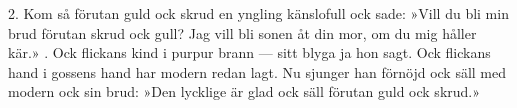 \setlength{\columnsep}{0.5cm}
\begin{multicols*}{2}
2.  Kom så förutan guld ock skrud
    en yngling känslofull
    ock sade: »Vill du bli min brud
    förutan skrud ock gull?
    Jag vill bli sonen åt din mor,
    om du mig håller kär.»
\vfill{}.  Ock flickans kind i purpur brann —
    sitt blyga ja hon sagt.
    Ock flickans hand i gossens hand
    har modern redan lagt.
    Nu sjunger han förnöjd ock säll
    med modern ock sin brud:
    »Den lycklige är glad ock säll
    förutan guld ock skrud.»
\end{multicols*}
